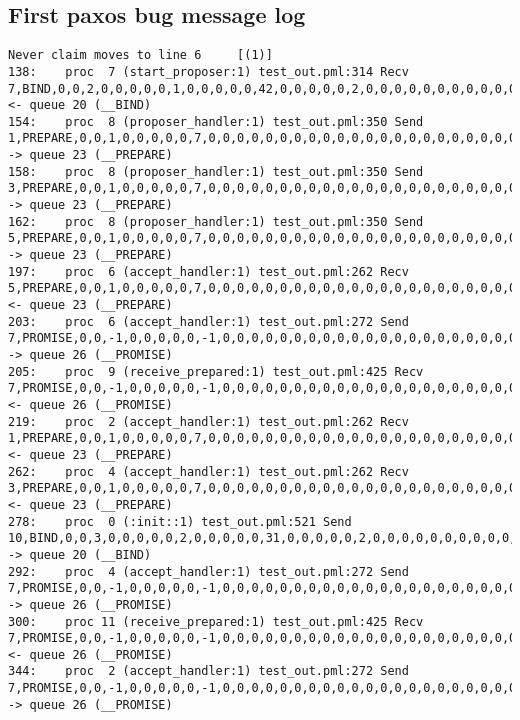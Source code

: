 \subsection{First paxos bug message log}
\begin{lstlisting}[xleftmargin=.01\linewidth, xrightmargin=0.01\linewidth, caption={Message passing caused by the proposer's protocol bug.}, label={lst:paxos_bug}]
    Never claim moves to line 6     [(1)]
138:    proc  7 (start_proposer:1) test_out.pml:314 Recv 7,BIND,0,0,2,0,0,0,0,0,1,0,0,0,0,0,42,0,0,0,0,0,2,0,0,0,0,0,0,0,0,0,0,0,0,0,0,0        <- queue 20 (__BIND)
154:    proc  8 (proposer_handler:1) test_out.pml:350 Send 1,PREPARE,0,0,1,0,0,0,0,0,7,0,0,0,0,0,0,0,0,0,0,0,0,0,0,0,0,0,0,0,0,0,0,0,0,0,0,0    -> queue 23 (__PREPARE)
158:    proc  8 (proposer_handler:1) test_out.pml:350 Send 3,PREPARE,0,0,1,0,0,0,0,0,7,0,0,0,0,0,0,0,0,0,0,0,0,0,0,0,0,0,0,0,0,0,0,0,0,0,0,0    -> queue 23 (__PREPARE)
162:    proc  8 (proposer_handler:1) test_out.pml:350 Send 5,PREPARE,0,0,1,0,0,0,0,0,7,0,0,0,0,0,0,0,0,0,0,0,0,0,0,0,0,0,0,0,0,0,0,0,0,0,0,0    -> queue 23 (__PREPARE)
197:    proc  6 (accept_handler:1) test_out.pml:262 Recv 5,PREPARE,0,0,1,0,0,0,0,0,7,0,0,0,0,0,0,0,0,0,0,0,0,0,0,0,0,0,0,0,0,0,0,0,0,0,0,0      <- queue 23 (__PREPARE)
203:    proc  6 (accept_handler:1) test_out.pml:272 Send 7,PROMISE,0,0,-1,0,0,0,0,0,-1,0,0,0,0,0,0,0,0,0,0,0,0,0,0,0,0,0,0,0,0,0,0,0,0,0,0,0    -> queue 26 (__PROMISE)
205:    proc  9 (receive_prepared:1) test_out.pml:425 Recv 7,PROMISE,0,0,-1,0,0,0,0,0,-1,0,0,0,0,0,0,0,0,0,0,0,0,0,0,0,0,0,0,0,0,0,0,0,0,0,0,0  <- queue 26 (__PROMISE)
219:    proc  2 (accept_handler:1) test_out.pml:262 Recv 1,PREPARE,0,0,1,0,0,0,0,0,7,0,0,0,0,0,0,0,0,0,0,0,0,0,0,0,0,0,0,0,0,0,0,0,0,0,0,0      <- queue 23 (__PREPARE)
262:    proc  4 (accept_handler:1) test_out.pml:262 Recv 3,PREPARE,0,0,1,0,0,0,0,0,7,0,0,0,0,0,0,0,0,0,0,0,0,0,0,0,0,0,0,0,0,0,0,0,0,0,0,0      <- queue 23 (__PREPARE)
278:    proc  0 (:init::1) test_out.pml:521 Send 10,BIND,0,0,3,0,0,0,0,0,2,0,0,0,0,0,31,0,0,0,0,0,2,0,0,0,0,0,0,0,0,0,0,0,0,0,0,0       -> queue 20 (__BIND)
292:    proc  4 (accept_handler:1) test_out.pml:272 Send 7,PROMISE,0,0,-1,0,0,0,0,0,-1,0,0,0,0,0,0,0,0,0,0,0,0,0,0,0,0,0,0,0,0,0,0,0,0,0,0,0    -> queue 26 (__PROMISE)
300:    proc 11 (receive_prepared:1) test_out.pml:425 Recv 7,PROMISE,0,0,-1,0,0,0,0,0,-1,0,0,0,0,0,0,0,0,0,0,0,0,0,0,0,0,0,0,0,0,0,0,0,0,0,0,0  <- queue 26 (__PROMISE)
344:    proc  2 (accept_handler:1) test_out.pml:272 Send 7,PROMISE,0,0,-1,0,0,0,0,0,-1,0,0,0,0,0,0,0,0,0,0,0,0,0,0,0,0,0,0,0,0,0,0,0,0,0,0,0    -> queue 26 (__PROMISE)

\end{lstlisting}
